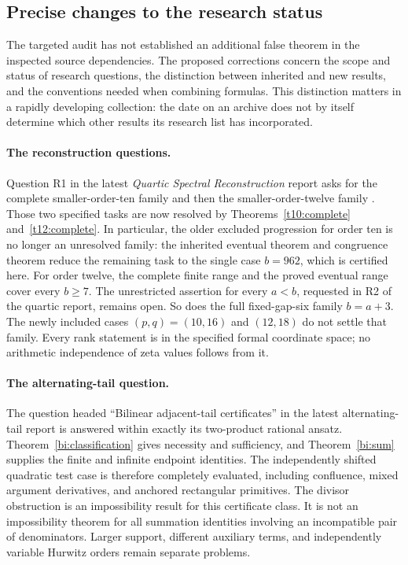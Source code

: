 \documentclass[11pt,letterpaper]{article}
\numberwithin{equation}{section}
\theoremstyle{definition}
\theoremstyle{remark}
\begin{document}
\subsection{Precise changes to the research status}

The targeted audit has not established an additional false theorem in
the inspected source dependencies. The proposed corrections concern
the scope and status of research questions, the distinction between
inherited and new results, and the conventions needed when combining
formulas. This distinction matters in a rapidly developing collection:
the date on an archive does not by itself determine which other results
its research list has incorporated.

\paragraph{The reconstruction questions.}
Question R1 in the latest \emph{Quartic Spectral Reconstruction}
report asks for the complete smaller-order-ten family and then the
smaller-order-twelve family \cite{tail-quartic}. Those two specified
tasks are now resolved by Theorems~\ref{t10:complete}
and~\ref{t12:complete}. In particular, the older excluded progression
for order ten is no longer an unresolved family: the inherited
eventual theorem and congruence theorem reduce the remaining task
to the single case $b=962$, which is certified here. For order twelve,
the complete finite range and the proved eventual range cover every
$b\ge7$. The unrestricted assertion for every $a<b$, requested in
R2 of the quartic report, remains open. So does the full fixed-gap-six
family $b=a+3$. The newly included cases $(p,q)=(10,16)$ and $(12,18)$
do not settle that family. Every rank statement is in the specified
formal coordinate space; no arithmetic independence of zeta values
follows from it.

\paragraph{The alternating-tail question.}
The question headed ``Bilinear adjacent-tail certificates'' in the
latest alternating-tail report \cite{tail-alternating} is answered
within exactly its two-product rational ansatz. Theorem~\ref{bi:classification}
gives necessity and sufficiency, and Theorem~\ref{bi:sum} supplies the
finite and infinite endpoint identities. The independently shifted
quadratic test case is therefore completely evaluated, including
confluence, mixed argument derivatives, and anchored rectangular
primitives. The divisor obstruction is an impossibility result for
this certificate class. It is not an impossibility theorem for all
summation identities involving an incompatible pair of denominators.
Larger support, different auxiliary terms, and independently variable
Hurwitz orders remain separate problems.
\end{document}
